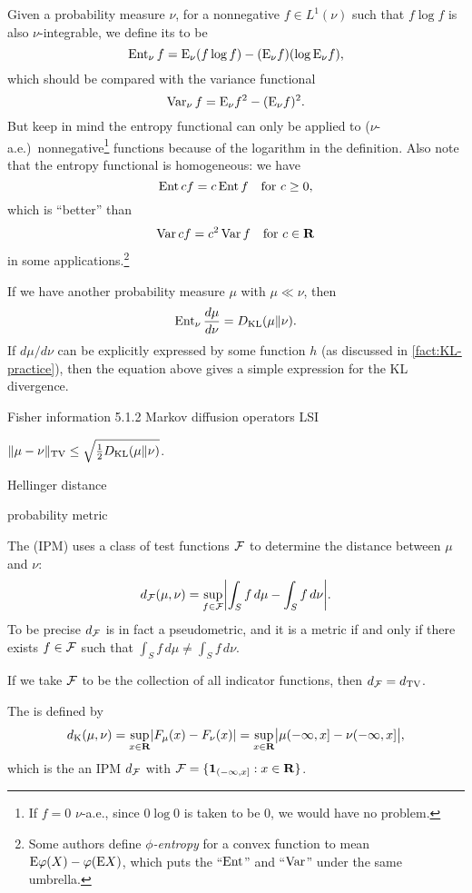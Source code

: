 Given a probability measure $\nu$, for a nonnegative $f \in L^1(\nu)$ such that $f \log f$ is also $\nu$-integrable, we define its  to be \[
    \operatorname{Ent}_\nu f = \mathop{}\!\mathrm{E}_\nu (f\log f) - (\mathop{}\!\mathrm{E}_\nu f)(\log \mathop{}\!\mathrm{E}_\nu f),
\] which should be compared with the variance functional \[
    \operatorname{Var}_\nu f = \mathop{}\!\mathrm{E}_\nu f^2 - (\mathop{}\!\mathrm{E}_\nu f)^2.
\] But keep in mind the entropy functional can only be applied to ($\nu$-a.e.)\ nonnegative\footnote{If $f = 0$ $\nu$-a.e., since $0\log 0$ is taken to be $0$, we would have no problem.} functions because of the logarithm in the definition. Also note that the entropy functional is homogeneous: we have \[
    \operatorname{Ent} cf = c\operatorname{Ent} f \quad \text{for } c\geq 0,
\] which is ``better'' than \[
    \operatorname{Var} cf = c^2 \operatorname{Var} f \quad \text{for }c\in \mathbf{R}
\] in some applications.\footnote{Some authors define \emph{$\phi$-entropy} for a convex function to mean $\mathop{}\!\mathrm{E} \varphi(X) - \varphi(\mathop{}\!\mathrm{E} X)$, which puts the ``$\operatorname{Ent}$'' and ``$\operatorname{Var}$'' under the same umbrella.}

If we have another probability measure $\mu$ with $\mu \ll \nu$, then \[
    \operatorname{Ent}_\nu \frac{d\mu}{d\nu} = D_{\mathrm{KL}}(\mu\Vert \nu).
\] If $d\mu/d\nu$ can be explicitly expressed by some function $h$ (as discussed in \cref{fact:KL-practice}), then the equation above gives a simple expression for the KL divergence.

Fisher information 5.1.2 Markov diffusion operators LSI

\begin{namedthm}
    $\lVert \mu - \nu \rVert_{\mathrm{TV}} \leq \sqrt{\frac 1 2 D_{\mathrm{KL}}(\mu\Vert \nu)}$.
\end{namedthm}

Hellinger distance

probability metric

The  (IPM) uses a class of test functions $\mathcal{F}$ to determine the distance between $\mu$ and $\nu$: \[
    d_{\mathcal{F}}(\mu,\nu) = \sup_{f \in \mathcal{F}} \biggl\vert \int_S f\,d\mu - \int_S f\,d\nu \bigg\vert.
\] To be precise $d_{\mathcal{F}}$ is in fact a pseudometric, and it is a metric if and only if there exists $f \in \mathcal{F}$ such that $\int_S f \,d\mu \neq \int_S f\,d\nu$.

If we take $\mathcal{F}$ to be the collection of all indicator functions, then $d_{\mathcal{F}} = d_\mathrm{TV}$.

The  is defined by \[
    d_{\mathrm{K}}(\mu,\nu) = \sup_{x\in \mathbf{R}} \lvert F_\mu(x) - F_\nu(x) \rvert = \sup_{x\in \mathbf{R}}\bigl\vert\mu(-\infty,x] - \nu(-\infty,x]\bigr\vert,
\] which is the an IPM $d_{\mathcal{F}}$ with $\mathcal{F} = \{\mathbf{1}_{(-\infty,x]} : x\in \mathbf{R}\}$.

